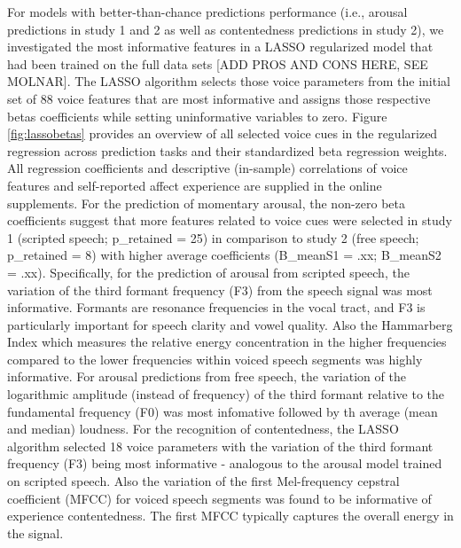 \documentclass[
  english,
  man,floatsintext]{apa6}
\begin{document}
For models with better-than-chance predictions performance (i.e., arousal predictions in study 1 and 2 as well as contentedness predictions in study 2), we investigated the most informative features in a LASSO regularized model that had been trained on the full data sets {[}ADD PROS AND CONS HERE, SEE MOLNAR{]}. The LASSO algorithm selects those voice parameters from the initial set of 88 voice features that are most informative and assigns those respective betas coefficients while setting uninformative variables to zero. Figure \ref{fig:lassobetas} provides an overview of all selected voice cues in the regularized regression across prediction tasks and their standardized beta regression weights. All regression coefficients and descriptive (in-sample) correlations of voice features and self-reported affect experience are supplied in the online supplements.
For the prediction of momentary arousal, the non-zero beta coefficients suggest that more features related to voice cues were selected in study 1 (scripted speech; p\_retained = 25) in comparison to study 2 (free speech; p\_retained = 8) with higher average coefficients (B\_meanS1 = .xx; B\_meanS2 = .xx). Specifically, for the prediction of arousal from scripted speech, the variation of the third formant frequency (F3) from the speech signal was most informative. Formants are resonance frequencies in the vocal tract, and F3 is particularly important for speech clarity and vowel quality. Also the Hammarberg Index which measures the relative energy concentration in the higher frequencies compared to the lower frequencies within voiced speech segments was highly informative.
For arousal predictions from free speech, the variation of the logarithmic amplitude (instead of frequency) of the third formant relative to the fundamental frequency (F0) was most infomative followed by th average (mean and median) loudness.
For the recognition of contentedness, the LASSO algorithm selected 18 voice parameters with the variation of the third formant frequency (F3) being most informative - analogous to the arousal model trained on scripted speech. Also the variation of the first Mel-frequency cepstral coefficient (MFCC) for voiced speech segments was found to be informative of experience contentedness. The first MFCC typically captures the overall energy in the signal.
\newpage
\end{document}
